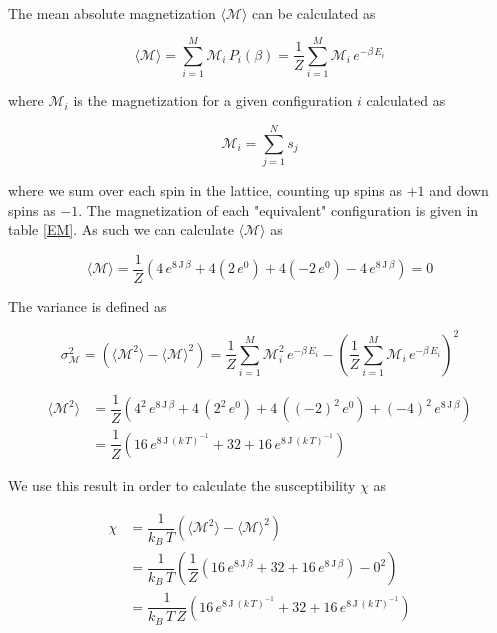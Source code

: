 \documentclass[a4paper, fontsize=11pt]{article}
\begin{document}
\paragraph{}
The mean absolute magnetization $\langle \mathcal{M} \rangle$ can be calculated as

\begin{equation}
\langle \mathcal{M} \rangle = \sum^M_{i=1} \mathcal{M}_{i} \, P_{i}(\beta) = \dfrac{1}{Z} \sum^M_{i=1} \mathcal{M}_{i} \, e^{-\beta \, E_{i}}
\end{equation}

where $\mathcal{M}_{i}$ is the magnetization for a given configuration $i$ calculated as

\begin{equation}
\mathcal{M}_{i} = \sum^N_{j=1} s_{j}
\end{equation}

where we sum over each spin in the lattice, counting up spins as $+1$ and down spins as $-1$. The magnetization of each "equivalent" configuration is given in table \ref{EM}. As such we can calculate $\langle \mathcal{M} \rangle$ as

\begin{equation}
\langle \mathcal{M} \rangle = \dfrac{1}{Z} \left( 4 \, e^{8 \, \text{J} \, \beta} + 4 (2 \, e^0) + 4 ( -2 \, e^0) -4 \, e^{8 \, \text{J} \, \beta} \right) = 0
\end{equation}

The variance is defined as 

\begin{equation}
\sigma^2_{\mathcal{M}} = \left( \langle \mathcal{M}^2 \rangle - \langle \mathcal{M} \rangle^2 \right) = \dfrac{1}{Z} \sum^M_{i=1} \mathcal{M}_{i}^2 \, e^{-\beta \, E_{i}} - \left( \dfrac{1}{Z} \sum^M_{i=1} \mathcal{M}_{i} \, e^{-\beta \, E_{i}} \right)^2
\end{equation}

\begin{align}
\langle \mathcal{M}^2 \rangle &= \dfrac{1}{Z} \left( 4^2 \, e^{8 \, \text{J} \, \beta} + 4 \, (2^2 \, e^0 ) + 4 \, ((-2)^2 \, e^0) + (-4)^2 \, e^{8 \, \text{J} \, \beta} \right) 
\\
&=\dfrac{1}{Z} \left( 16 \, e^{8 \, \text{J} \, (k \, T)^{-1}} + 32 + 16 \, e^{8 \, \text{J} \, (k \, T)^{-1}} \right) 
\end{align}

We use this result in order to calculate the susceptibility $\chi$ as

\begin{align}
\chi &= \dfrac{1}{k_{B} \, T} \left( \langle \mathcal{M}^2 \rangle - \langle \mathcal{M} \rangle^2 \right)
\\
&=\dfrac{1}{k_{B} \, T} \left( \dfrac{1}{Z} \left( 16 \, e^{8 \, \text{J} \, \beta} + 32 + 16 \, e^{8 \, \text{J} \, \beta} \right)  - 0^2 \right)
\\
&= 
\dfrac{1}{k_{B} \, T \, Z} \left( 16 \, e^{8 \, \text{J} \, (k \, T)^{-1}} + 32 + 16 \, e^{8 \, \text{J} \, (k \, T)^{-1}} \right) 
\end{align}
\end{document}
